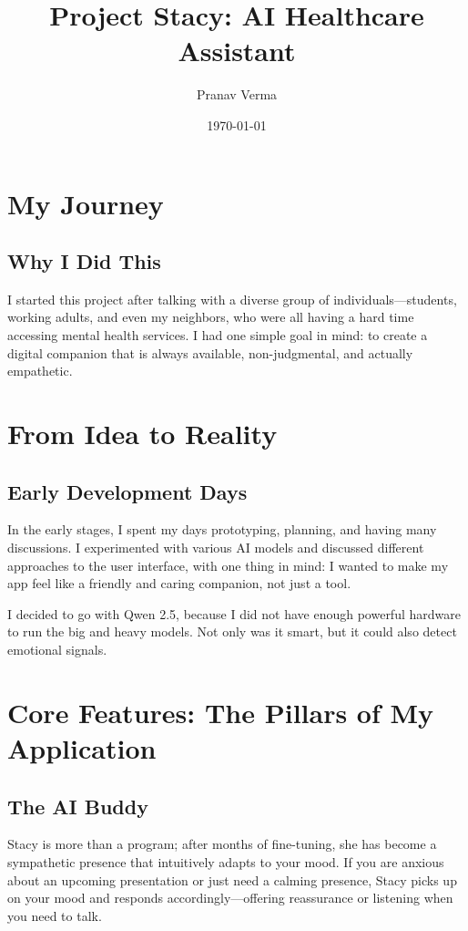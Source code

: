 \documentclass[12pt]{article}
\title{Project Stacy: AI Healthcare Assistant}
\author{Pranav Verma}
\date{\today}
\begin{document}
\maketitle
\tableofcontents
\newpage

\section{My Journey}

\subsection{Why I Did This}
I started this project after talking with a diverse group of individuals—students, working adults, and even my neighbors, who were all having a hard time accessing mental health services. I had one simple goal in mind: to create a digital companion that is always available, non-judgmental, and actually empathetic.

\section{From Idea to Reality}

\subsection{Early Development Days}
In the early stages, I spent my days prototyping, planning, and having many discussions. I experimented with various AI models and discussed different approaches to the user interface, with one thing in mind: I wanted to make my app feel like a friendly and caring companion, not just a tool.

I decided to go with Qwen 2.5, because I did not have enough powerful hardware to run the big and heavy models. Not only was it smart, but it could also detect emotional signals.

\section{Core Features: The Pillars of My Application}

\subsection{The AI Buddy}
Stacy is more than a program; after months of fine-tuning, she has become a sympathetic presence that intuitively adapts to your mood. If you are anxious about an upcoming presentation or just need a calming presence, Stacy picks up on your mood and responds accordingly—offering reassurance or listening when you need to talk.
\end{document}
